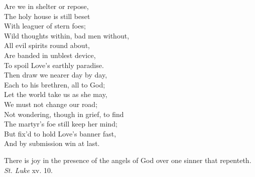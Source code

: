  Are we in shelter or repose, \\
 The holy house is still beset \\
 With leaguer of stern foes; \\
 Wild thoughts within, bad men without, \\
 All evil spirits round about, \\
 Are banded in unblest device, \\
 To spoil Love’s earthly paradise. \\
  Then draw we nearer day by day, \\
 Each to his brethren, all to God; \\
 Let the world take us as she may, \\
 We must not change our road; \\
 Not wondering, though in grief, to find \\
 The martyr’s foe still keep her mind; \\
 But fix’d to hold Love’s banner fast, \\
 And by submission win at last.\\


There is joy in the presence of the angels of God over one sinner that repenteth. \emph{St. Luke} xv. 10.

